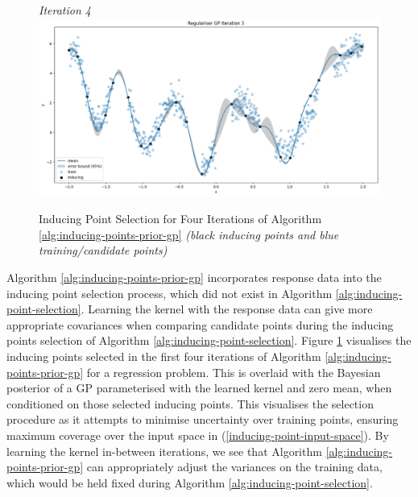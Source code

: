 \documentclass{article}
\numberwithin{equation}{section}
\begin{document}
\begin{figure}[h!]
\begin{minipage}{.5\textwidth}
  \textit{Iteration 4}
  \includegraphics[width=\linewidth, trim={0 0 0 0.77cm},clip]{thesis_report/figures/inducing_points_kernel/iteration-3/prediction.png}
\end{minipage}%
\caption{
Inducing Point Selection for Four Iterations of Algorithm \ref{alg:inducing-points-prior-gp} \textit{(black inducing points and blue training/candidate points)}
}
\label{inducing-points-and-kernel}
\end{figure}

Algorithm \ref{alg:inducing-points-prior-gp} incorporates response data into the inducing point selection process, which did not exist in Algorithm \ref{alg:inducing-point-selection}. 
Learning the kernel with the response data can give more appropriate covariances when comparing candidate points during the inducing points selection of Algorithm \ref{alg:inducing-point-selection}. 
Figure \ref{inducing-points-and-kernel} visualises the inducing points selected in the first four iterations of Algorithm \ref{alg:inducing-points-prior-gp} for a regression problem.
This is overlaid with the Bayesian posterior of a GP parameterised with the learned kernel and zero mean, when conditioned on those selected inducing points. 
This visualises the selection procedure as it attempts to minimise uncertainty over training points, ensuring maximum coverage over the input space in (\ref{inducing-point-input-space}).
By learning the kernel in-between iterations, we see that Algorithm \ref{alg:inducing-points-prior-gp} can appropriately adjust the variances on the training data, which would be held fixed during Algorithm \ref{alg:inducing-point-selection}.
\end{document}
